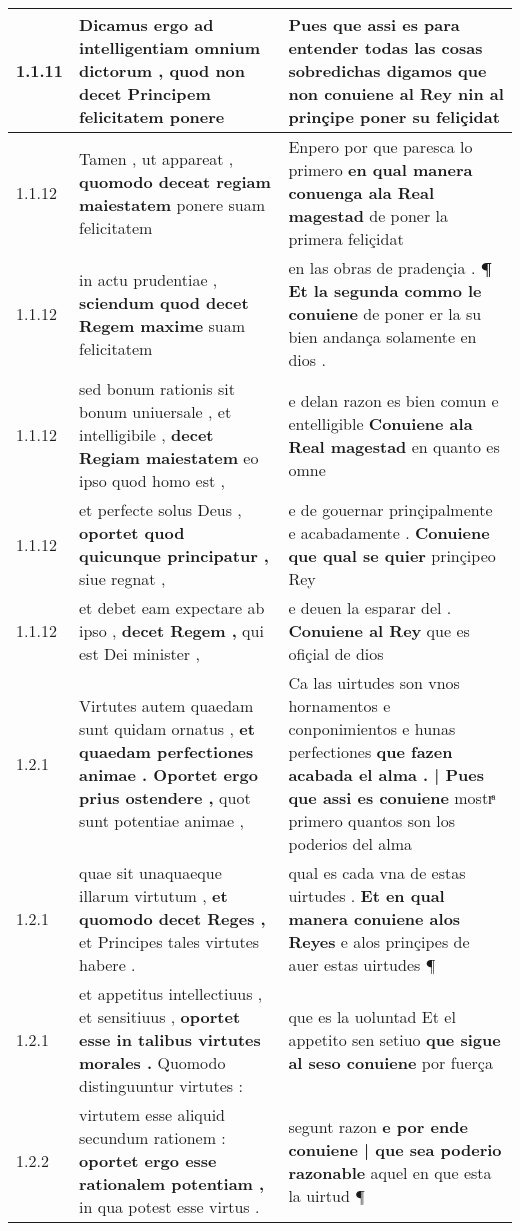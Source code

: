 \begin{tabular}{|p{1cm}|p{6.5cm}|p{6.5cm}|}
1.1.11 & Dicamus ergo ad intelligentiam omnium dictorum , \textbf{ quod non decet } Principem felicitatem ponere & Pues que assi es para entender todas las cosas sobredichas digamos \textbf{ que non conuiene al Rey } nin al prinçipe poner su feliçidat \\\hline
1.1.12 & Tamen , ut appareat , \textbf{ quomodo deceat regiam maiestatem } ponere suam felicitatem & Enpero por que paresca lo primero \textbf{ en qual manera conuenga ala Real magestad } de poner la primera feliçidat \\\hline
1.1.12 & in actu prudentiae , \textbf{ sciendum quod decet Regem maxime } suam felicitatem & en las obras de pradençia . \textbf{ ¶ Et la segunda commo le conuiene } de poner er la su bien andança solamente en dios . \\\hline
1.1.12 & sed bonum rationis sit bonum uniuersale , et intelligibile , \textbf{ decet Regiam maiestatem } eo ipso quod homo est , & e delan razon es bien comun e entelligible \textbf{ Conuiene ala Real magestad } en quanto es omne \\\hline
1.1.12 & et perfecte solus Deus , \textbf{ oportet quod quicunque principatur , } siue regnat , & e de gouernar prinçipalmente e acabadamente . \textbf{ Conuiene que qual se quier } prinçipeo Rey \\\hline
1.1.12 & et debet eam expectare ab ipso , \textbf{ decet Regem , } qui est Dei minister , & e deuen la esparar del . \textbf{ Conuiene al Rey } que es ofiçial de dios \\\hline
1.2.1 & Virtutes autem quaedam sunt quidam ornatus , \textbf{ et quaedam perfectiones animae . Oportet ergo prius ostendere , } quot sunt potentiae animae , & Ca las uirtudes son vnos hornamentos e conponimientos e hunas perfectiones \textbf{ que fazen acabada el alma . | Pues que assi es conuiene } mostrͣ primero quantos son los poderios del alma \\\hline
1.2.1 & quae sit unaquaeque illarum virtutum , \textbf{ et quomodo decet Reges , } et Principes tales virtutes habere . & qual es cada vna de estas uirtudes . \textbf{ Et en qual manera conuiene alos Reyes } e alos prinçipes de auer estas uirtudes ¶ \\\hline
1.2.1 & et appetitus intellectiuus , et sensitiuus , \textbf{ oportet esse in talibus virtutes morales . } Quomodo distinguuntur virtutes : & que es la uoluntad Et el appetito sen setiuo \textbf{ que sigue al seso conuiene } por fuerça \\\hline
1.2.2 & virtutem esse aliquid secundum rationem : \textbf{ oportet ergo esse rationalem potentiam , } in qua potest esse virtus . & segunt razon \textbf{ e por ende conuiene | que sea poderio razonable } aquel en que esta la uirtud ¶ \\\hline

\end{tabular}
